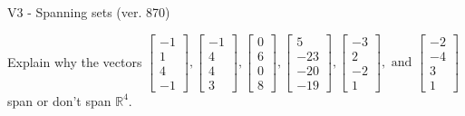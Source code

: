 \begin{exercise}
  \begin{exerciseTitle}V3 - Spanning sets (ver. 870)\end{exerciseTitle}
  \begin{exerciseStatement}
    Explain why the vectors \(\left[\begin{array}{r}
-1 \\
1 \\
4 \\
-1
\end{array}\right] , \left[\begin{array}{r}
-1 \\
4 \\
4 \\
3
\end{array}\right] , \left[\begin{array}{r}
0 \\
6 \\
0 \\
8
\end{array}\right] , \left[\begin{array}{r}
5 \\
-23 \\
-20 \\
-19
\end{array}\right] , \left[\begin{array}{r}
-3 \\
2 \\
-2 \\
1
\end{array}\right] , \text{ and } \left[\begin{array}{r}
-2 \\
-4 \\
3 \\
1
\end{array}\right]\) span or don't span \(\mathbb{R}^4\). 
	



\end{exerciseStatement}
\end{exercise}

